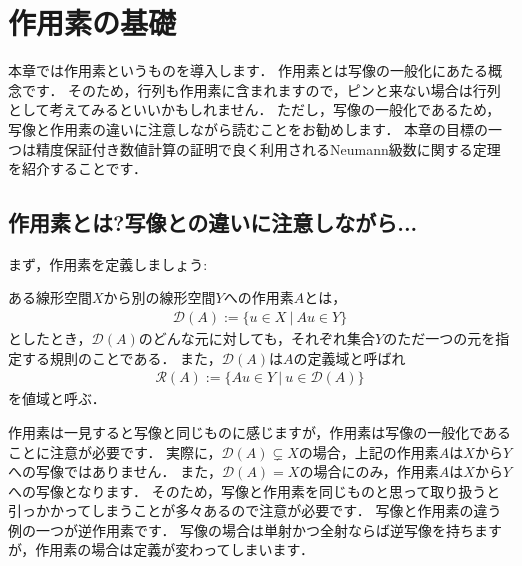 \newpage 
\section{作用素の基礎}
本章では作用素というものを導入します．
作用素とは写像の一般化にあたる概念です．
そのため，行列も作用素に含まれますので，ピンと来ない場合は行列として考えてみるといいかもしれません．
ただし，写像の一般化であるため，写像と作用素の違いに注意しながら読むことをお勧めします．
本章の目標の一つは精度保証付き数値計算の証明で良く利用されるNeumann級数に関する定理を紹介することです．


\subsection{作用素とは?写像との違いに注意しながら...}
まず，作用素を定義しましょう:

\begin{defi}[作用素]\label{def:operator}
ある線形空間$X$から別の線形空間$Y$への作用素$A$とは，
\begin{align*}
{\mathcal D}(A):=\{ u \in X ~ | ~ Au \in Y \}
\end{align*}
としたとき，${\mathcal D}(A)$のどんな元に対しても，それぞれ集合$Y$のただ一つの元を指定する規則のことである．
また，${\mathcal D}(A)$は$A$の定義域と呼ばれ
\begin{align*}
{\mathcal R}(A):=\{ Au \in Y ~ | ~ u \in {\mathcal D}(A) \}
\end{align*}
を値域と呼ぶ．
\end{defi}


作用素は一見すると写像と同じものに感じますが，作用素は写像の一般化であることに注意が必要です．
実際に，${\mathcal D}(A) \subsetneq X$の場合，上記の作用素$A$は$X$から$Y$への写像ではありません．
また，${\mathcal D}(A) = X$の場合にのみ，作用素$A$は$X$から$Y$への写像となります．
そのため，写像と作用素を同じものと思って取り扱うと引っかかってしまうことが多々あるので注意が必要です．
写像と作用素の違う例の一つが逆作用素です．
写像の場合は単射かつ全射ならば逆写像を持ちますが，作用素の場合は定義が変わってしまいます．

